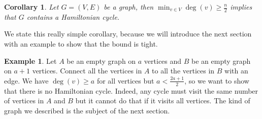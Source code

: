 \documentclass{tufte-handout}
\newtheorem{cor}[thm]{Corollary}
\theoremstyle{definition}
\newtheorem{exmp}[thm]{Example}
\theoremstyle{remark}
\begin{document}
\begin{cor}
	Let $G = (V,E)$ be a graph, then $\min_{v \in V} \deg(v) \geq \frac{n}{2}$ implies that $G$ contains a Hamiltonian cycle.
\end{cor}
We state this really simple corollary, because we will introduce the next section with an example to show that the bound is tight. 
\begin{exmp}
	Let $A$ be an empty graph on $a$ vertices and $B$ be an empty graph on $a+1$ vertices. Connect all the vertices in $A$ to all the vertices in $B$ with an edge. We have $\deg(v) \geq a$ for all vertices but $a < \frac{2a+1}{2}$, so we want to show that there is no Hamiltonian cycle. Indeed, any cycle must visit the same number of vertices in $A$ and $B$ but it cannot do that if it visits all vertices. The kind of graph we described is the subject of the next section.
\end{exmp}
\end{document}
